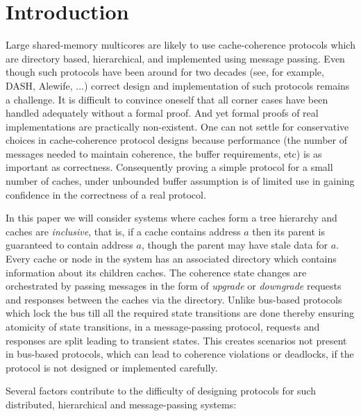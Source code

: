 \section{Introduction} 

Large shared-memory multicores are likely to use cache-coherence protocols
which are directory based, hierarchical, and implemented using message passing.
Even though such protocols have been around for two decades (see, for example,
DASH\cite{DASH}, Alewife\cite{Anant}, ...) correct design and implementation of
such protocols remains a challenge. It is difficult to convince oneself that
all corner cases have been handled adequately without a formal proof. And yet
formal proofs of real implementations are practically non-existent. One can not
settle for conservative choices in cache-coherence protocol designs because
performance (\eg the number of messages needed to maintain coherence, the
buffer requirements, etc) is as important as correctness. Consequently proving
a simple protocol for a small number of caches, under unbounded buffer
assumption is of limited use in gaining confidence in the correctness of a real
protocol. 

In this paper we will consider systems where caches form a tree hierarchy and
caches are \emph{inclusive}, that is, if a cache contains address $a$ then its
parent is guaranteed to contain address $a$, though the parent may have stale
data for $a$. Every cache or node in the system has an associated directory
which contains information about its children caches. The coherence state
changes are orchestrated by passing messages in the form of \emph{upgrade} or
\emph{downgrade} requests and responses between the caches via the directory.
Unlike bus-based protocols which lock the bus till all the required state
transitions are done thereby ensuring atomicity of state transitions, in a
message-passing protocol, requests and responses are split leading to transient
states. This creates scenarios not present in bus-based protocols, which can
lead to coherence violations or deadlocks, if the protocol is not designed or
implemented carefully.

Several factors contribute to the difficulty of designing protocols for such
distributed, hierarchical and message-passing systems:

